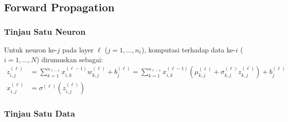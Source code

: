 \documentclass[11pt,a4paper]{article}
\theoremstyle{plain}
\theoremstyle{definition}
\theoremstyle{remark}
\begin{document}
\subsection{Forward Propagation}
\label{subsec:forward_reparam}

\subsubsection{Tinjau Satu Neuron}
\label{subsubsec:forward_satu_neuron}

\noindent Untuk neuron ke-$j$ pada layer $\ell$ ($j = 1, \dots, n_\ell$), komputasi terhadap data ke-$i$ ($i = 1, \dots, N$) dirumuskan sebagai:
\begin{align}
    z^{(\ell)}_{i, j} &= \sum_{k=1}^{n_{\ell-1}} x^{(\ell-1)}_{i, k} w^{(\ell)}_{k, j} + b^{(\ell)}_j = \sum_{k=1}^{n_{\ell-1}} x^{(\ell-1)}_{i, k} \left( \mu^{(\ell)}_{k, j} + \sigma^{(\ell)}_{k, j} z^{(\ell)}_{k, j} \right) + b^{(\ell)}_j \label{eq:forward_scalar_z} \\
    x^{(\ell)}_{i, j} &= \sigma^{(\ell)}\!\left( z^{(\ell)}_{i, j} \right) \label{eq:forward_scalar_x}
\end{align}

\subsubsection{Tinjau Satu Data}
\label{subsubsec:forward_satu_data}
\end{document}
